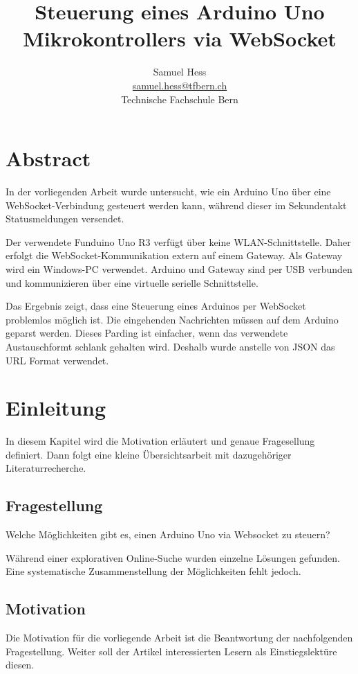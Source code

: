 
\subject{ICT Modul 121 -- Steuerungsaufgaben bearbeiten}
\title{Steuerung eines Arduino Uno Mikrokontrollers via WebSocket}
\subtitle{}
\author{Samuel Hess \\ 
\href{mailto:samuel.hess@tfbern.ch}{samuel.hess@tfbern.ch} \\ 
Technische Fachschule Bern}


\maketitle

\newpage
\tableofcontents
\newpage

\section{Abstract}
In der vorliegenden Arbeit wurde untersucht, wie ein Arduino Uno über eine WebSocket-Verbindung
gesteuert werden kann, während dieser im Sekundentakt Statusmeldungen versendet.

Der verwendete Funduino Uno R3 \cite{lernset} verfügt über keine WLAN-Schnittstelle. Daher erfolgt
die WebSocket-Kommunikation extern auf einem Gateway. Als Gateway wird ein Windows-PC verwendet.
Arduino und Gateway sind per USB verbunden und kommunizieren über eine virtuelle serielle
Schnittstelle.

Das Ergebnis zeigt, dass eine Steuerung eines Arduinos per WebSocket problemlos möglich ist. 
Die eingehenden Nachrichten müssen auf dem Arduino geparst werden. Dieses Parding ist einfacher, 
wenn das verwendete Austauschformt schlank gehalten wird. Deshalb wurde anstelle von JSON das URL Format verwendet.

\section{Einleitung}
In diesem Kapitel wird die Motivation erläutert und genaue Fragesellung definiert. Dann folgt eine kleine Übersichtsarbeit mit dazugehöriger Literaturrecherche.  
\subsection{Fragestellung}
Welche Möglichkeiten gibt es, einen Arduino Uno via Websocket zu steuern?

Während einer explorativen Online-Suche wurden einzelne Lösungen gefunden. Eine systematische Zusammenstellung der Möglichkeiten fehlt jedoch.
\subsection{Motivation}
Die Motivation für die vorliegende Arbeit ist die Beantwortung der nachfolgenden Fragestellung.
Weiter soll der Artikel interessierten Lesern als Einstiegslektüre diesen.
